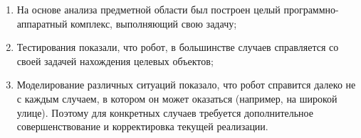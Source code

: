 \begin{enumerate}
  \item На основе анализа предметной области был построен целый программно-аппаратный комплекс, выполняющий свою задачу;
  \item Тестирования показали, что робот, в большинстве случаев справляется со своей задачей нахождения целевых объектов;
  \item Моделирование различных ситуаций показало, что робот справится далеко не с каждым случаем, в котором он может оказаться (например, на широкой улице). Поэтому для конкретных случаев требуется дополнительное совершенствование и корректировка текущей реализации.
\end{enumerate}
